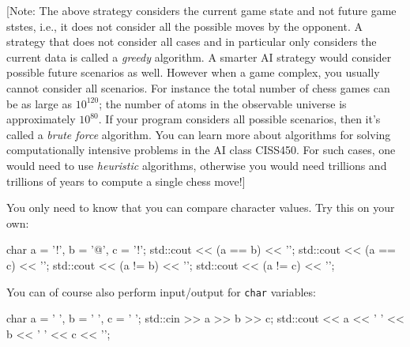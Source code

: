 [Note: The above strategy considers the current game state
and not future game ststes, i.e., it does not consider
all the possible moves by the opponent. 
A strategy that does not consider all cases and in particular
only considers the current data is called 
a \textit{greedy} algorithm.
A smarter AI strategy would consider possible future scenarios
as well.
However when a game complex, you usually cannot consider
all scenarios.
For instance the total number of chess games can be as large as 
$10^{120}$; 
the number of atoms in the observable universe is approximately
$10^{80}$.
If your program considers all possible scenarios, then
it's called a \textit{brute force} algorithm.
You can learn more about algorithms for solving 
computationally intensive problems in the AI class CISS450.
For such cases, one would need to use \textit{heuristic}
algorithms, otherwise you would need trillions and trillions
of years to 
compute a single chess move!]

You only need to know that you can compare character values.
Try this on your own:
{\footnotesize
\begin{console}
char a = '!', b = '@', c = '!';
std::cout << (a == b) << '\n';
std::cout << (a == c) << '\n';
std::cout << (a != b) << '\n';
std::cout << (a != c) << '\n';
\end{console}
}
You can of course also perform input/output for \verb!char! variables:
{\footnotesize
\begin{console}
char a = ' ', b = ' ', c = ' ';
std::cin >> a >> b >> c;
std::cout << a << ' ' << b << ' ' << c << '\n';
\end{console}
}

